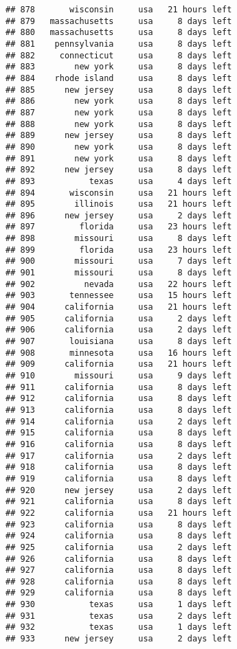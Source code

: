 \documentclass[
]{article}
\begin{document}
\begin{verbatim}
## 878       wisconsin     usa   21 hours left
## 879   massachusetts     usa     8 days left
## 880   massachusetts     usa     8 days left
## 881    pennsylvania     usa     8 days left
## 882     connecticut     usa     8 days left
## 883        new york     usa     8 days left
## 884    rhode island     usa     8 days left
## 885      new jersey     usa     8 days left
## 886        new york     usa     8 days left
## 887        new york     usa     8 days left
## 888        new york     usa     8 days left
## 889      new jersey     usa     8 days left
## 890        new york     usa     8 days left
## 891        new york     usa     8 days left
## 892      new jersey     usa     8 days left
## 893           texas     usa     4 days left
## 894       wisconsin     usa   21 hours left
## 895        illinois     usa   21 hours left
## 896      new jersey     usa     2 days left
## 897         florida     usa   23 hours left
## 898        missouri     usa     8 days left
## 899         florida     usa   23 hours left
## 900        missouri     usa     7 days left
## 901        missouri     usa     8 days left
## 902          nevada     usa   22 hours left
## 903       tennessee     usa   15 hours left
## 904      california     usa   21 hours left
## 905      california     usa     2 days left
## 906      california     usa     2 days left
## 907       louisiana     usa     8 days left
## 908       minnesota     usa   16 hours left
## 909      california     usa   21 hours left
## 910        missouri     usa     9 days left
## 911      california     usa     8 days left
## 912      california     usa     8 days left
## 913      california     usa     8 days left
## 914      california     usa     2 days left
## 915      california     usa     8 days left
## 916      california     usa     8 days left
## 917      california     usa     2 days left
## 918      california     usa     8 days left
## 919      california     usa     8 days left
## 920      new jersey     usa     2 days left
## 921      california     usa     8 days left
## 922      california     usa   21 hours left
## 923      california     usa     8 days left
## 924      california     usa     8 days left
## 925      california     usa     2 days left
## 926      california     usa     8 days left
## 927      california     usa     8 days left
## 928      california     usa     8 days left
## 929      california     usa     8 days left
## 930           texas     usa     1 days left
## 931           texas     usa     2 days left
## 932           texas     usa     1 days left
## 933      new jersey     usa     2 days left

\end{verbatim}
\end{document}
